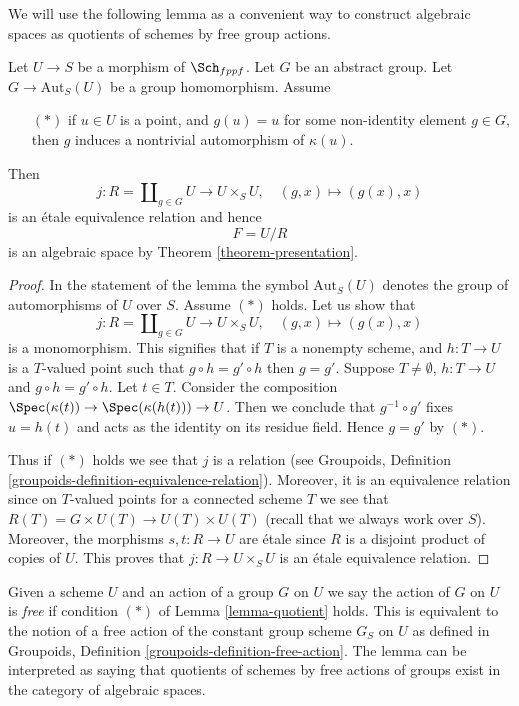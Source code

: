 \medskip\noindent
We will use the following lemma as a convenient way to construct
algebraic spaces as quotients of schemes by free group actions.

\begin{lemma}
\label{lemma-quotient}
Let $U \to S$ be a morphism of $\Sch_{fppf}$.
Let $G$ be an abstract group. Let $G \to \text{Aut}_S(U)$
be a group homomorphism. Assume
\begin{itemize}
\item[$(*)$] if $u \in U$ is a point, and $g(u) = u$
for some non-identity element $g \in G$, then $g$
induces a nontrivial automorphism of $\kappa(u)$.
\end{itemize}
Then
$$
j :
R = \coprod\nolimits_{g \in G} U
\longrightarrow
U \times_S U,
\quad
(g, x) \longmapsto (g(x), x)
$$
is an \'etale equivalence relation and hence
$$
F = U/R
$$
is an algebraic space by Theorem \ref{theorem-presentation}.
\end{lemma}

\begin{proof}
In the statement of the lemma the symbol $\text{Aut}_S(U)$ denotes
the group of automorphisms of $U$ over $S$.
Assume $(*)$ holds. Let us show that
$$
j :
R = \coprod\nolimits_{g \in G} U
\longrightarrow
U \times_S U,
\quad
(g, x) \longmapsto (g(x), x)
$$
is a monomorphism. This signifies that if $T$ is a nonempty
scheme, and $h : T \to U$ is a $T$-valued point such that
$g \circ h = g' \circ h$ then $g = g'$. Suppose
$T \not = \emptyset$, $h : T \to U$ and $g \circ h = g' \circ h$.
Let $t \in T$. Consider the composition
$\Spec(\kappa(t)) \to \Spec(\kappa(h(t))) \to U$.
Then we conclude that $g^{-1} \circ g'$ fixes $u = h(t)$ and
acts as the identity on its residue field. Hence $g = g'$ by $(*)$.

\medskip\noindent
Thus if $(*)$ holds we see that $j$ is a relation (see
Groupoids, Definition \ref{groupoids-definition-equivalence-relation}).
Moreover, it is an equivalence relation since on $T$-valued points
for a connected scheme $T$ we see that
$R(T) = G \times U(T) \to U(T) \times U(T)$ (recall that we always
work over $S$). Moreover, the morphisms $s, t : R \to U$ are \'etale
since $R$ is a disjoint product of copies of $U$.
This proves that $j : R \to U \times_S U$ is an \'etale equivalence relation.
\end{proof}

\noindent
Given a scheme $U$ and an action of a group $G$ on $U$ we say the action
of $G$ on $U$ is {\it free} if condition $(*)$ of Lemma \ref{lemma-quotient}
holds. This is equivalent to the notion of a free action of the constant
group scheme $G_S$ on $U$ as defined in
Groupoids, Definition \ref{groupoids-definition-free-action}.
The lemma can be interpreted as saying that quotients of schemes by
free actions of groups exist in the category of algebraic spaces.

